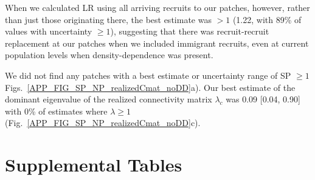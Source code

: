 \documentclass[12pt, oneside]{article}   	%
\begin{document}
When we calculated LR using all arriving recruits to our patches, however, rather than just those originating there, the best estimate was $> 1$ (1.22, with 89\% of values with uncertainty $\geq 1$), suggesting that there was recruit-recruit replacement at our patches when we included immigrant recruits, even at current population levels when density-dependence was present.

We did not find any patches with a best estimate or uncertainty range of SP $\geq 1$ Figs.\ \ref{APP_FIG_SP_NP_realizedCmat_noDD}a). Our best estimate of the dominant eigenvalue of the realized connectivity matrix $\lambda_c$ was 0.09 [0.04, 0.90] with 0\% of estimates where $\lambda \geq 1$ (Fig.\ \ref{APP_FIG_SP_NP_realizedCmat_noDD}c). 

\newpage{}

\section{Supplemental Tables}
\end{document}
